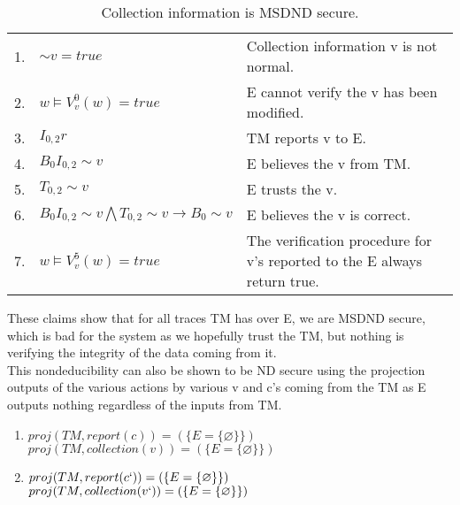 \documentclass[journal,onecolumn]{IEEEtran}
\begin{document}
\begin{enumerate}
\begin{enumerate}
      \begin{table}[H]
        \caption{Collection information is MSDND secure.}
        \centering
        \begin{tabular}{lll}
        1.  & ${\sim} v = true$          & Collection information v is not normal.                                                       \\
        2.  & $w \vDash V^0_v(w) = true$ & E cannot verify the v has been modified.                                 \\
        3.  & $I_{0,2}r$                 & TM reports v to E.                                                \\
        4.  & $B_0I_{0,2} {\sim} v$      & E believes the v from TM.                                     \\
        5.  & $T_{0,2} {\sim} v$         & E trusts the v.                                                          \\
        6.  & $B_0I_{0,2} {\sim} v \bigwedge T_{0,2} {\sim} v \rightarrow B_0 {\sim} v$ & E believes the v is correct.                                             \\
        7.  & $w \vDash V^5_v(w) = true$  & The verification procedure for v's reported to the E always return true.
        \end{tabular}
      \end{table}

      These claims show that for all traces TM has over E, we are MSDND secure, which is bad for the system as we hopefully trust the TM, but nothing is verifying the integrity of the data coming from it. \\

      This nondeducibility can also be shown to be ND secure using the projection outputs of the various actions by various v and c's coming from the TM as E outputs nothing regardless of the inputs from TM. \\

      \begin{enumerate}
        \item $proj(TM, report(c)) = (\{E = \{\varnothing\}\})$ \\
        $proj(TM, collection(v)) = (\{E = \{\varnothing\}\})$
        \item $proj(TM, report(c`)) = (\{E = \{\varnothing\}\})$ \\
        $proj(TM, collection(v`)) = (\{E = \{\varnothing\}\})$ \\
      \end{enumerate}


\end{enumerate}
\end{enumerate}
\end{document}
